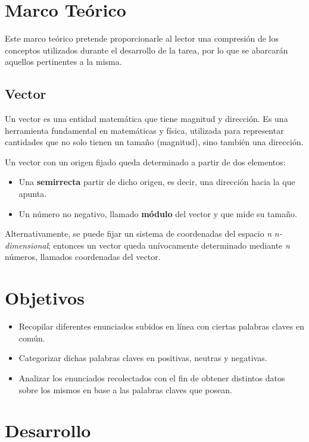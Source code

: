 \documentclass{article}
\begin{document}
\section{Marco Teórico}\label{sec:marco-teorico}
    Este marco teórico pretende proporcionarle al lector una compresión de los conceptos utilizados durante el
    desarrollo de la tarea, por lo que se abarcarán aquellos pertinentes a la misma.

\subsection{Vector}\label{subsec:vector}
    Un vector es una entidad matemática que tiene magnitud y dirección.
    Es una herramienta fundamental en matemáticas y física, utilizada para representar cantidades que no solo tienen
    un tamaño (magnitud), sino también una dirección.

    Un vector con un origen fijado queda determinado a partir de dos elementos:
    \begin{itemize}
        \item Una \textbf{semirrecta} partir de dicho origen, es decir, una dirección hacia la que apunta.
        \item Un número no negativo, llamado \textbf{módulo} del vector y que mide su tamaño.
    \end{itemize}

    Alternativamente, se puede fijar un sistema de coordenadas del espacio \textit{n} \textit{n-dimensional};
    entonces un vector queda unívocamente determinado mediante \textit{n} números, llamados coordenadas del vector.

\section{Objetivos}
\begin{itemize}
    \item Recopilar diferentes enunciados subidos en línea con ciertas palabras claves en común.
    \item Categorizar dichas palabras claves en positivas, neutras y negativas.
    \item Analizar los enunciados recolectados con el fin de obtener distintos datos sobre los mismos en base a las palabras claves que posean.
\end{itemize}

\section{Desarrollo}
\end{document}
